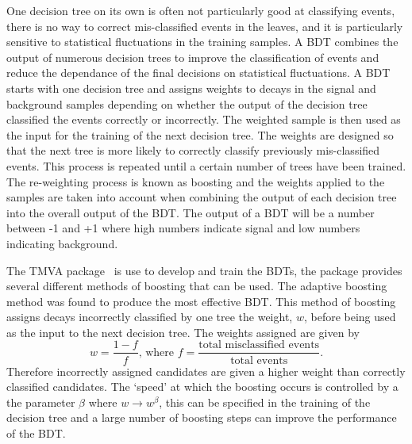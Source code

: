 One decision tree on its own is often not particularly good at classifying events, there is no way to correct mis-classified events in the leaves, and it is particularly sensitive to statistical fluctuations in the training samples. A BDT combines the output of numerous decision trees to improve the classification of events and reduce the dependance of the final decisions on statistical fluctuations. A BDT starts with one decision tree and assigns weights to decays in the signal and background samples depending on whether the output of the decision tree classified the events correctly or incorrectly. The weighted sample is then used as the input for the training of the next decision tree. The weights are designed so that the next tree is more likely to correctly classify previously mis-classified events. This process is repeated until a certain number of trees have been trained. The re-weighting process is known as boosting and the weights applied to the samples are taken into account when combining the output of each decision tree into the overall output of the BDT. The output of a BDT will be a number between -1 and +1 where high numbers indicate signal and low numbers indicating background.


The TMVA package~\cite{} is use to develop and train the BDTs, the package provides several different methods of boosting that can be used. The adaptive boosting method was found to produce the most effective BDT.
This method of boosting assigns decays incorrectly classified by one tree the weight, $w$, before being used as the input to the next decision tree. The weights assigned are given by
\begin{equation}
w = \frac{1 - f}{f}\text{, where } f = \frac{\text{total misclassified events}}{\text{total events}}.
\end{equation}
Therefore incorrectly assigned candidates are given a higher weight than correctly classified candidates. The `speed’ at which the boosting occurs is controlled by a the parameter $\beta$ where $w \rightarrow w^{\beta}$, this can be specified in the training of the decision tree and a large number of boosting steps can improve the performance of the BDT.

